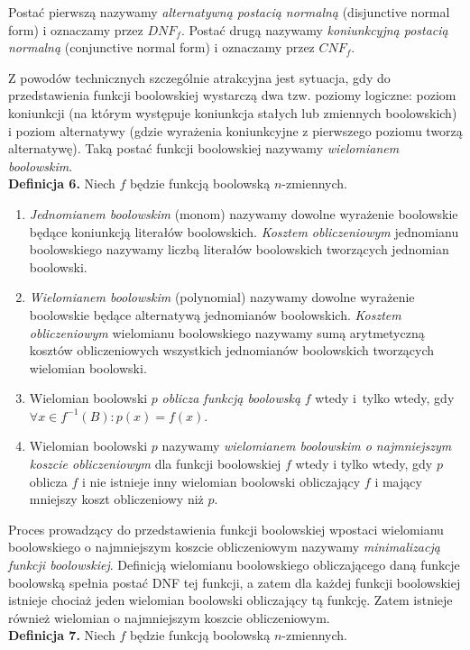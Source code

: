 \documentclass[a4paper,11pt,twoside]{article}
\theoremstyle{definition}
\begin{document}
Postać pierwszą nazywamy {\em alternatywną postacią normalną} (disjunctive normal form) i oznaczamy przez $\mathit{DNF}_f$. Postać drugą nazywamy {\em koniunkcyjną postacią normalną} (conjunctive normal form) i oznaczamy przez $\mathit{CNF}_f$.

Z powodów technicznych szczególnie atrakcyjna jest sytuacja, gdy do przedstawienia funkcji boo\-lowskiej wystarczą dwa tzw. poziomy logiczne: poziom koniunkcji (na którym występuje koniunkcja stałych lub zmiennych boolowskich) i poziom alternatywy (gdzie wyrażenia koniunkcyjne z pierwszego poziomu tworzą alternatywę). Taką postać funkcji boolowskiej nazywamy {\em wielomianem boolowskim}.\\
\newline
\textbf{Definicja 6.} Niech $f$ będzie funkcją boolowską $n$-zmiennych.
\begin{enumerate}
\item {\em Jednomianem boolowskim} (monom) nazywamy dowolne wyrażenie boolowskie będące koniunkcją literałów boolowskich. {\em Kosztem obliczeniowym} jednomianu boolowskiego nazywamy liczbą literałów boolowskich tworzących jednomian boolowski.
\item {\em Wielomianem boolowskim} (polynomial) nazywamy dowolne wyrażenie boolowskie będące alternatywą jednomianów boolowskich. {\em Kosztem obliczeniowym} wielomianu boolowskiego nazywamy sumą arytmetyczną kosztów obliczeniowych wszystkich jednomianów boolowskich tworzących wielomian boolowski.
\item Wielomian boolowski $p$ {\em oblicza funkcją boolowską} $f$ wtedy i~tylko wtedy, gdy\\ $\forall x \in f^{-1}(B)\colon p(x) = f(x)$.
\item Wielomian boolowski $p$ nazywamy {\em wielomianem boolowskim o najmniejszym koszcie obliczeniowym} dla funkcji boolowskiej $f$ wtedy i tylko wtedy, gdy $p$ oblicza $f$ i nie istnieje inny wielomian boolowski obliczający $f$ i mający mniejszy koszt obliczeniowy niż $p$.
\end{enumerate}

Proces prowadzący do przedstawienia funkcji boolowskiej wpostaci wielomianu boolowskiego o najmniejszym koszcie obliczeniowym nazywamy {\em minimalizacją funkcji boolowskiej}. Definicją wielomianu boolowskiego obliczającego daną funkcje boolowską spełnia postać DNF tej funkcji, a zatem dla każdej funkcji boolowskiej istnieje chociaż jeden wielomian boolowski obliczający tą funkcję. Zatem istnieje również wielomian o najmniejszym koszcie obliczeniowym. \\
\newline
\textbf{Definicja 7.} Niech $f$ będzie funkcją boolowską $n$-zmiennych. 
\end{document}
